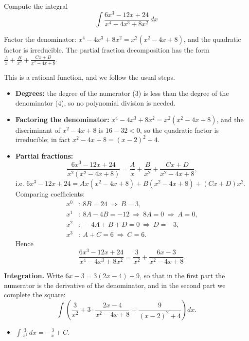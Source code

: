 
\begin{question}
Compute the integral
\[ \int \frac{6x^3 - 12x + 24}{x^4 - 4x^3 + 8x^2}\,dx \]
\end{question}

\begin{hint}
Factor the denominator: $x^4 - 4x^3 + 8x^2 = x^2(x^2 - 4x + 8)$, and the quadratic factor is irreducible. The partial fraction decomposition has the form $\frac{A}{x} + \frac{B}{x^2} + \frac{Cx + D}{x^2 - 4x + 8}$.
\end{hint}

\begin{solution}
This is a rational function, and we follow the usual steps.
\begin{itemize}
  \item \textbf{Degrees:} the degree of the numerator ($3$) is less than the degree of the denominator ($4$), so no polynomial division is needed.
  \item \textbf{Factoring the denominator:} $x^4 - 4x^3 + 8x^2 = x^2(x^2 - 4x + 8)$, and the discriminant of $x^2 - 4x + 8$ is $16 - 32 < 0$, so the quadratic factor is irreducible; in fact $x^2 - 4x + 8 = (x - 2)^2 + 4$.
  \item \textbf{Partial fractions:}
  \[ \frac{6x^3 - 12x + 24}{x^2(x^2 - 4x + 8)} = \frac{A}{x} + \frac{B}{x^2} + \frac{Cx + D}{x^2 - 4x + 8}, \]
  i.e. $6x^3 - 12x + 24 = Ax(x^2 - 4x + 8) + B(x^2 - 4x + 8) + (Cx + D)x^2$. Comparing coefficients:
  \begin{align*}
    x^0 &: \ 8B = 24 \ \Rightarrow\ B = 3, \\
    x^1 &: \ 8A - 4B = -12 \ \Rightarrow\ 8A = 0 \ \Rightarrow\ A = 0, \\
    x^2 &: \ -4A + B + D = 0 \ \Rightarrow\ D = -3, \\
    x^3 &: \ A + C = 6 \ \Rightarrow\ C = 6.
  \end{align*}
  Hence
  \[ \frac{6x^3 - 12x + 24}{x^4 - 4x^3 + 8x^2} = \frac{3}{x^2} + \frac{6x - 3}{x^2 - 4x + 8}. \]
\end{itemize}
\textbf{Integration.} Write $6x - 3 = 3(2x - 4) + 9$, so that in the first part the numerator is the derivative of the denominator, and in the second part we complete the square:
\[ \int \left( \frac{3}{x^2} + 3\cdot\frac{2x - 4}{x^2 - 4x + 8} + \frac{9}{(x - 2)^2 + 4} \right) dx. \]
\begin{itemize}
  \item $\int \frac{3}{x^2}\,dx = -\frac{3}{x} + C$.

\end{itemize}
\end{solution}
